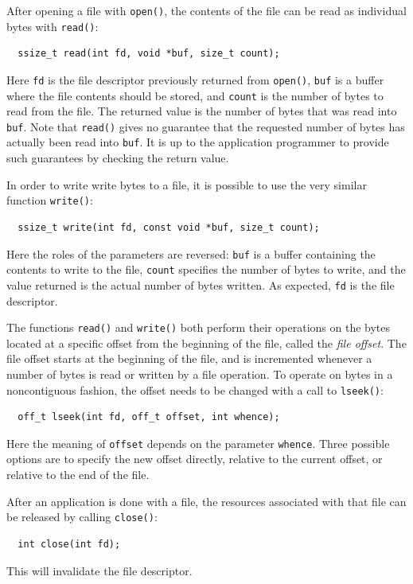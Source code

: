 After opening a file with \texttt{open()}, the contents of the file can be read as individual bytes with \texttt{read()}:
\begin{verbatim}
  ssize_t read(int fd, void *buf, size_t count);
\end{verbatim}
Here \texttt{fd} is the file descriptor previously returned from \texttt{open()}, \texttt{buf} is a buffer where the file contents should be stored, and \texttt{count} is the number of bytes to read from the file. The returned value is the number of bytes that was read into \texttt{buf}. Note that \texttt{read()} gives no guarantee that the requested number of bytes has actually been read into \texttt{buf}. It is up to the application programmer to provide such guarantees by checking the return value.

In order to write write bytes to a file, it is possible to use the very similar function \texttt{write()}:
\begin{verbatim}
  ssize_t write(int fd, const void *buf, size_t count);
\end{verbatim}
Here the roles of the parameters are reversed: \texttt{buf} is a buffer containing the contents to write to the file, \texttt{count} specifies the number of bytes to write, and the value returned is the actual number of bytes written. As expected, \texttt{fd} is the file descriptor.

The functions \texttt{read()} and \texttt{write()} both perform their operations on the bytes located at a specific offset from the beginning of the file, called the \emph{file offset}. The file offset starts at the beginning of the file, and is incremented whenever a number of bytes is read or written by a file operation. To operate on bytes in a noncontiguous fashion, the offset needs to be changed with a call to \texttt{lseek()}:
\begin{verbatim}
  off_t lseek(int fd, off_t offset, int whence);
\end{verbatim}
Here the meaning of \texttt{offset} depends on the parameter \texttt{whence}. Three possible options are to specify the new offset directly, relative to the current offset, or relative to the end of the file.

After an application is done with a file, the resources associated with that file can be released by calling \texttt{close()}:
\begin{verbatim}
  int close(int fd);
\end{verbatim}
This will invalidate the file descriptor.\cite{linux-man-pages}


